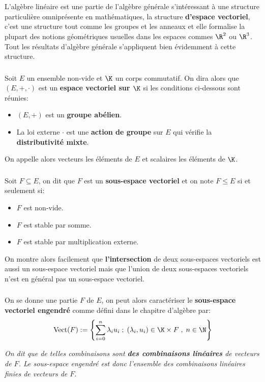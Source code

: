 \chapter*{} %
L'algèbre linéaire est une partie de l'algèbre générale s'intéressant à une structure particulière omniprésente en mathématiques, la structure \textbf{d'espace vectoriel}, c'est une structure tout comme les groupes et les anneaux et elle formalise la plupart des notions géométriques usuelles dans les espaces commes \( \R^2 \) ou \( \R^3 \). Tout les résultats d'algèbre générale s'appliquent bien évidemment à cette structure.
\subsection*{}
Soit \(E\) un ensemble non-vide et \(\K\) un corps commutatif. On dira alors que \((E, +, \cdot)\) est un \textbf{espace vectoriel sur \( \K \)} si les conditions ci-dessous sont réunies:
\begin{itemize}
   \item \((E, +)\) est un \textbf{groupe abélien}.
   \item La loi externe \( \cdot \) est une \textbf{action de groupe} sur \( E \) qui vérifie la \textbf{distributivité mixte}.
\end{itemize}
On appelle alors vecteurs les éléments de \(E\) et scalaires les éléments de \(\K\).
\subsection*{}
Soit \(F \subseteq E\), on dit que \(F\) est un \textbf{sous-espace vectoriel} et on note \( F \leq E \) si et seulement si:
\begin{itemize}
   \item \( F \) est non-vide.
   \item \( F \) est stable par somme.
   \item \( F \) est stable par multiplication externe.
\end{itemize}

On montre alors facilement que \textbf{l'intersection} de deux sous-espaces vectoriels est aussi un sous-espace vectoriel mais que l'union de deux sous-espaces vectoriels n'est en général pas un sous-espace vectoriel.
\subsection*{}
On se donne une partie \( F \) de \( E \), on peut alors caractériser le \textbf{sous-espace vectoriel engendré} comme défini dans le chapitre d'algèbre par:
\[
   \text{Vect(\(F\))} := \left\{ \sum_{i=0}^{n} \lambda_i u_i\; ; \; (\lambda_{i}, u_{i}) \in \K \times F \; , \;  n \in \N  \right\}
\]
\begin{center}
    \textit{
      On dit que de telles combinaisons sont \textbf{des combinaisons linéaires} de vecteurs de \(F\). Le sous-espace engendré est donc l'ensemble des combinaisons linéaires finies de vecteurs de \( F \).
    }
\end{center}
